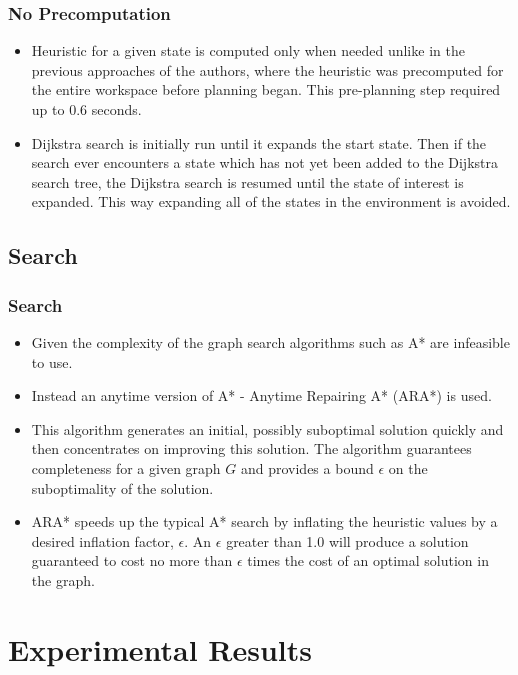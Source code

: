 \documentclass{beamer}
\begin{document}
\begin{frame}
\frametitle{No Precomputation}
\begin{itemize}
\item Heuristic for a given state is computed only when needed unlike in the
previous approaches of the authors, where the heuristic was precomputed for the
entire workspace before planning began. This pre-planning step required up to
0.6 seconds. 
\item Dijkstra search is initially run until it expands the start state. Then if
the search ever encounters a state which has not yet been added to the Dijkstra search tree, the Dijkstra
search is resumed until the state of interest is expanded. This way expanding
all of the states in the environment is avoided.
\end{itemize}
\end{frame}


\subsection{Search} 
\begin{frame}
\frametitle{Search}
\begin{itemize} 
  \item Given the complexity of the graph search algorithms such as A* are
  infeasible to use.
  \item Instead an anytime version of A* - Anytime Repairing A* (ARA*) is used.
  \item This algorithm generates an initial, possibly suboptimal solution
quickly and then concentrates on improving this solution. The algorithm guarantees
completeness for a given graph $G$ and provides a bound $\epsilon$ on the
suboptimality of the solution.
\item ARA* speeds up the typical A* search by
inflating the heuristic values by a desired inflation factor, $\epsilon$.
An $\epsilon$ greater than 1.0 will produce a solution guaranteed to
cost no more than $\epsilon$ times the cost of an optimal solution in
the graph.
\end{itemize}
\end{frame}


\section{Experimental Results} 
\end{document}
